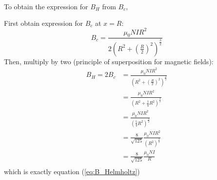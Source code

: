 \documentclass[12pt]{article}
\begin{document}
To obtain the expression for $B_H$ from $B_c$,

First obtain expression for $B_c$ at $x=R$:
\begin{equation*}
    B_c = \frac{\mu_0NIR^2}{2(R^2+(\frac{R}{2})^2)^\frac{3}{2}}
\end{equation*}
Then, multiply by two (principle of superposition for magnetic fields):
\begin{equation*}
    \begin{aligned}
        B_H = 2 B_c
         & = \frac{\mu_0NIR^2}{(R^2+(\frac{R}{2})^2)^\frac{3}{2}} \\
         & = \frac{\mu_0NIR^2}{(R^2+\frac{1}{4}R^2)^\frac{3}{2}}  \\
         & = \frac{\mu_0NIR^2}{(\frac{5}{4}R^2)^\frac{3}{2}}      \\
         & = \frac{8}{\sqrt{125}}\frac{\mu_0NIR^2}{(R^2)^\frac{3}{2}}\\
         & = \frac{8}{\sqrt{125}}\frac{\mu_0NI}{R}\\
    \end{aligned}
\end{equation*}
which is exactly equation (\ref{eq:B_Helmholtz})
\end{document}
